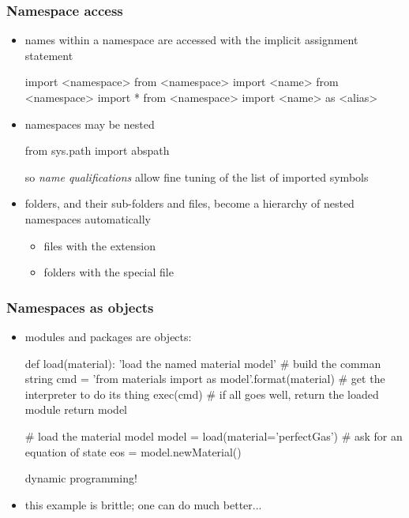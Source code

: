 \begin{frame}[fragile]
%
  \frametitle{Namespace access}
%
  \begin{itemize}
%
  \item names within a namespace are accessed with the  implicit assignment
    statement
    \begin{ipython}{}
      import <namespace>
      from <namespace> import <name>
      from <namespace> import *
      from <namespace> import <name> as <alias>
    \end{ipython}
%
  \item namespaces may be nested
    \begin{ipython}{}
      from sys.path import abspath
    \end{ipython}
    so \emph{name qualifications} allow fine tuning of the list of imported symbols
%
  \item folders, and their sub-folders and files, become a hierarchy of nested namespaces
    automatically
    \begin{itemize}
    \item files with the  extension
    \item folders with the  special file
    \end{itemize}
%
  \end{itemize}
%
\end{frame}

\begin{frame}[fragile]
%
  \frametitle{Namespaces as objects}
%
  \begin{itemize}
%
  \item modules and packages are objects:
    \begin{ipython}{}
      def load(material):
          'load the named {material} model'
          # build the comman string
          cmd = 'from materials import {} as model'.format(material)
          # get the interpreter to do its thing
          exec(cmd)
          # if all goes well, return the loaded module
          return model

      # load the material model
      model = load(material='perfectGas')
      # ask for an equation of state
      eos = model.newMaterial()
    \end{ipython}
    dynamic programming!
%
  \item this example is brittle; one can do much better...
%
  \end{itemize}
%
\end{frame}

